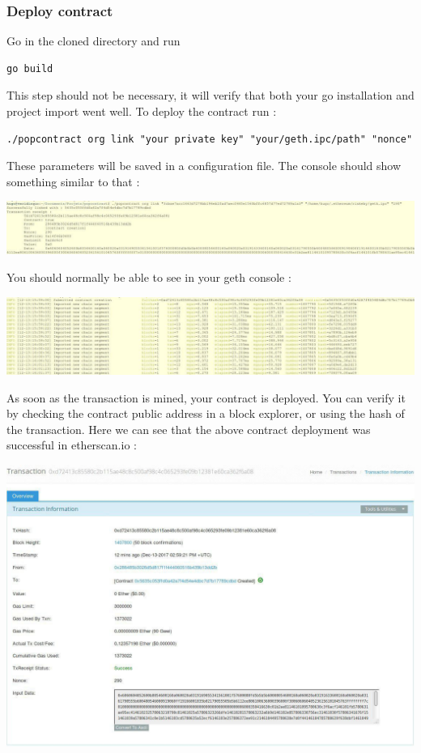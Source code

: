 \documentclass[11pt, a4paper, twoside, openright]{book} %
\begin{document}
\subsubsection*{Deploy contract}
Go in the cloned directory and run
\begin{verbatim}
go build
\end{verbatim}
This step should not be necessary, it will verify that both your go installation and project import went well.
To deploy the contract run : 
\begin{verbatim}
./popcontract org link "your private key" "your/geth.ipc/path" "nonce"
\end{verbatim}
These parameters will be saved in a configuration file.
The console should show something similar to that : 
\begin{center}
\includegraphics[scale=0.45]{orglink.jpg}
\end{center}
You should normally be able to see in your geth console : 
\begin{center}
\includegraphics[scale=0.45]{gethconsole.jpg}
\end{center}

As soon as the transaction is mined, your contract is deployed. You can verify it by checking the contract public address in a block explorer, or using the hash of the transaction. Here we can see that the above contract deployment was successful in etherscan.io :
\begin{center}
\includegraphics[scale=0.5]{blockexplorer.jpg}
\end{center} 
\end{document}
